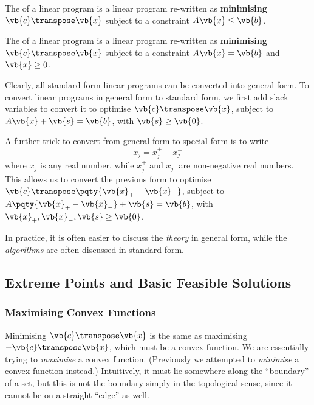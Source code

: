 \begin{definition}
    The  of a linear program is a linear program re-written as \textbf{minimising} \(\vb{c}\transpose \vb{x}\) subject to a constraint \(A\vb{x} \leq \vb{b}\).
\end{definition}

\begin{definition}
    The  of a linear program is a linear program re-written as \textbf{minimising} \(\vb{c}\transpose \vb{x}\) subject to a constraint \(A\vb{x} = \vb{b}\) and \(\vb{x} \geq 0\).
\end{definition}

Clearly, all standard form linear programs can be converted into general form. To convert linear programs in general form to standard form, we first add slack variables to convert it to optimise \(\vb{c}\transpose \vb{x}\), subject to \(A \vb{x} + \vb{s} = \vb{b}\), with \(\vb{s} \geq \vb{0}\).

A further trick to convert from general form to special form is to write
\[
    x_j = x_j^+ - x_j^-
\]
where \(x_j\) is any real number, while \(x_j^+\) and \(x_j^-\) are non-negative real numbers. This allows us to convert the previous form to optimise \(\vb{c}\transpose \pqty{\vb{x}_+ - \vb{x}_-}\), subject to \(A \pqty{\vb{x}_+ - \vb{x}_-} + \vb{s} = \vb{b}\), with \(\vb{x}_+, \vb{x}_-, \vb{s} \geq \vb{0}\).

In practice, it is often easier to discuss the \emph{theory} in general form, while the \emph{algorithms} are often discussed in standard form.

\subsection{Extreme Points and Basic Feasible Solutions}
\subsubsection{Maximising Convex Functions}

Minimising \(\vb{c}\transpose \vb{x}\) is the same as maximising \(-\vb{c}\transpose \vb{x}\), which must be a convex function. We are essentially trying to \emph{maximise} a convex function. (Previously we attempted to \emph{minimise} a convex function instead.) Intuitively, it must lie somewhere along the ``boundary'' of a set, but this is not the boundary simply in the topological sense, since it cannot be on a straight ``edge'' as well.

